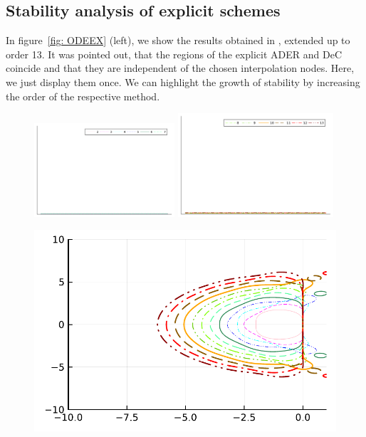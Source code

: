 \subsection{Stability analysis of explicit schemes}\label{sec:stability_explicit}
In figure~\ref{fig: ODEEX} (left), we show the results obtained in \cite{Han_Veiga_2021}, extended up to order 13. It was pointed out, that the regions of the explicit ADER and DeC coincide and that they are independent of the chosen interpolation nodes. Here, we just display them once. We can highlight the growth of stability by increasing the order of the respective method. 
\begin{figure}
	\centering
	\includegraphics[width=0.465\textwidth,trim={215 340 32 22}, clip]{pdf/odepics/colors_a-d_new_horiz_2-7_no_order.pdf}\!\!
	\includegraphics[width=0.515\textwidth,trim={179 340 30 22}, clip]{pdf/odepics/colors_a-d_new_horiz_8-13_no_order.pdf}\\
	\begin{minipage}[t]{0.32\textwidth}
		\centering
		\includegraphics[width=\textwidth]{pdf/odepics/DeC_GLB_ord13.pdf}\\

\end{minipage}
\end{figure}

